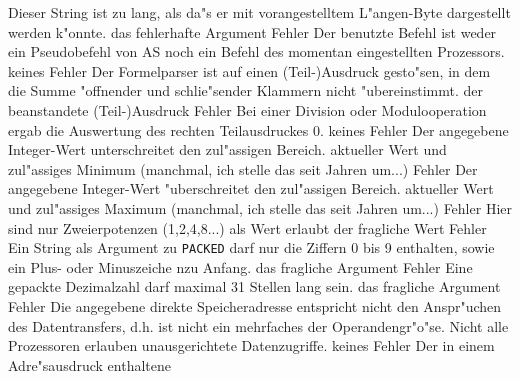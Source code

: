 \documentclass[12pt,a4paper,twoside]{report}
\newcommand{\asname}{AS}
\begin{document}
\begin{description}
               {Dieser String ist zu lang, als da"s er mit vorangestelltem
                L"angen-Byte dargestellt werden k"onnte.}
               {das fehlerhafte Argument}
               {Fehler}
               {Der benutzte Befehl ist weder ein Pseudobefehl
                von \asname{} noch ein Befehl des momentan eingestellten
                Prozessors.}
               {keines}
               {Fehler}
               {Der Formelparser ist auf einen (Teil-)Ausdruck
                gesto"sen, in dem die Summe "offnender und schlie"sender
                Klammern nicht "ubereinstimmt.}
               {der beanstandete (Teil-)Ausdruck}
               {Fehler}
               {Bei einer Division oder Modulooperation ergab
                die Auswertung des rechten Teilausdruckes 0.}
               {keines}
               {Fehler}
               {Der angegebene Integer-Wert unterschreitet
                den zul"assigen Bereich.}
               {aktueller Wert und zul"assiges Minimum
	        (manchmal, ich stelle das seit Jahren um...)}
               {Fehler}
               {Der angegebene Integer-Wert "uberschreitet
                den zul"assigen Bereich.}
               {aktueller Wert und zul"assiges Maximum
	        (manchmal, ich stelle das seit Jahren um...)}
               {Fehler}
               {Hier sind nur Zweierpotenzen (1,2,4,8...)
                als Wert erlaubt}
               {der fragliche Wert}
               {Fehler}
               {Ein String als Argument zu {\tt PACKED} darf nur
                die Ziffern 0 bis 9 enthalten, sowie ein Plus- oder
                Minuszeiche nzu Anfang.}
               {das fragliche Argument}
               {Fehler}
               {Eine gepackte Dezimalzahl darf maximal 31 Stellen
                lang sein.}
               {das fragliche Argument}
               {Fehler}
               {Die angegebene direkte Speicheradresse
                entspricht nicht den Anspr"uchen des Datentransfers, d.h.
                ist nicht ein mehrfaches der Operandengr"o"se.  Nicht alle
                Prozessoren erlauben unausgerichtete Datenzugriffe.}
               {keines}
               {Fehler}
               {Der in einem Adre"sausdruck enthaltene
}
\end{description}
\end{document}
